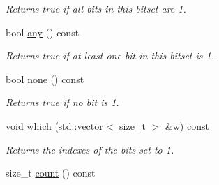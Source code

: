 \begin{DoxyCompactItemize}
\begin{DoxyCompactList}\small\item\em Returns true if all bits in this bitset are 1. \end{DoxyCompactList}\item 
\hypertarget{classlgraph_1_1utils_1_1static__bitset_ad0da7d9a48299308d4567bb5199d3f5b}{bool \hyperlink{classlgraph_1_1utils_1_1static__bitset_ad0da7d9a48299308d4567bb5199d3f5b}{any} () const }\label{classlgraph_1_1utils_1_1static__bitset_ad0da7d9a48299308d4567bb5199d3f5b}

\begin{DoxyCompactList}\small\item\em Returns true if at least one bit in this bitset is 1. \end{DoxyCompactList}\item 
\hypertarget{classlgraph_1_1utils_1_1static__bitset_ada662ae7a76fca5dd0fb85e134c17647}{bool \hyperlink{classlgraph_1_1utils_1_1static__bitset_ada662ae7a76fca5dd0fb85e134c17647}{none} () const }\label{classlgraph_1_1utils_1_1static__bitset_ada662ae7a76fca5dd0fb85e134c17647}

\begin{DoxyCompactList}\small\item\em Returns true if no bit is 1. \end{DoxyCompactList}\item 
void \hyperlink{classlgraph_1_1utils_1_1static__bitset_adb1ec14364ad297f803a200592ca4a9a}{which} (std\-::vector$<$ size\-\_\-t $>$ \&w) const 
\begin{DoxyCompactList}\small\item\em Returns the indexes of the bits set to 1. \end{DoxyCompactList}\item 
\hypertarget{classlgraph_1_1utils_1_1static__bitset_a8d848c930956cd1ec5b378e64dd3e274}{size\-\_\-t \hyperlink{classlgraph_1_1utils_1_1static__bitset_a8d848c930956cd1ec5b378e64dd3e274}{count} () const }\label{classlgraph_1_1utils_1_1static__bitset_a8d848c930956cd1ec5b378e64dd3e274}


\end{DoxyCompactItemize}
